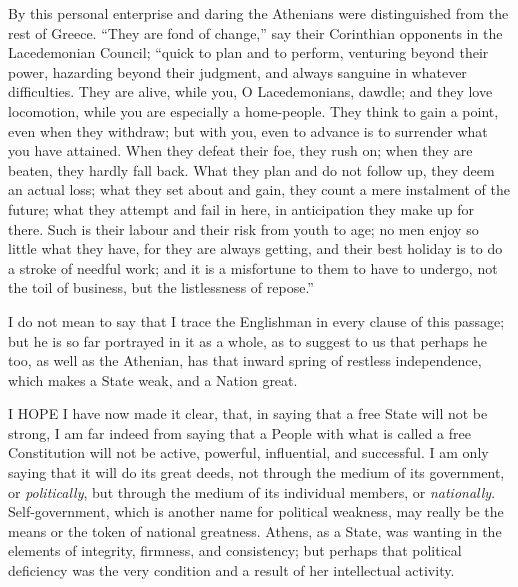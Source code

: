 By this personal enterprise and daring the
Athenians were distinguished from the rest of Greece. ``They are fond
of change,'' say their Corinthian opponents in the Lacedemonian
Council; ``quick to plan and to perform, venturing beyond their power,
hazarding beyond their judgment, and always sanguine in whatever
difficulties. They are alive, while you, O Lacedemonians, dawdle; and
they love locomotion, while you are especially a home-people. They
think to gain a point, even when they withdraw; but with you, even to
advance is to surrender what you have attained. When they defeat their
foe, they rush on; when they are beaten, they hardly fall back. What
they plan and do not follow up, they deem an actual loss; what they
set about and gain, they count a mere instalment of the future; what
they attempt and fail in here, in anticipation they make up for there.
Such is their labour and their risk from youth to age; no men enjoy so
little what they have, for they are always getting, and their best
holiday is to do a stroke of needful work; and it is a misfortune to
them to have to undergo, not the toil of business, but the
listlessness of repose.''

I do not mean to say that I trace the Englishman
in every clause of this passage; but he is so far portrayed in it as a
whole, as to suggest to us that perhaps he too, as well as the
Athenian, has that inward spring of restless independence, which makes
a State weak, and a Nation great.


I HOPE
I have now made it clear, that, in saying that a free State will not
be strong, I am far indeed from saying that a People with what is
called a free Constitution will not be active, powerful, influential,
and successful. I am only saying that it will do its great deeds, not
through the medium of its government, or \emph{politically}, but
through the medium of its individual members, or \emph{nationally}.
Self-government, which is another name for political weakness, may
really be the means or the token of national greatness. Athens, as a
State, was wanting in the elements of integrity, firmness, and
consistency; but perhaps that political deficiency was the very
condition and a result of her intellectual activity.

